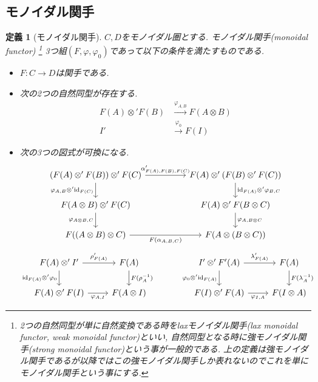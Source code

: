 \documentclass[a4paper,12pt]{ltjsarticle}
\theoremstyle{break}
\newtheorem{defn}[thm]{定義}
\newcommand{\xr}[1]{\xrightarrow{#1}}
\newcommand{\id}{\mathrm{id}}
\newcommand{\al}{\alpha}
\newcommand{\la}{\lambda}
\newcommand{\vp}{\varphi}
\newcommand{\ot}{\otimes}
\numberwithin{equation}{section}
\begin{document}
\subsection{モノイダル関手}

\begin{defn}[モノイダル関手]
  $C,D$をモノイダル圏とする. 
  モノイダル関手(monoidal functor)
  \footnote{
  2つの自然同型が単に自然変換である時をlaxモノイダル関手(lax monoidal functor, weak monoidal functor)といい, 自然同型となる時に強モノイダル関手(strong monoidal functor)という事が一般的である.
  上の定義は強モノイダル関手であるが以降ではこの強モノイダル関手しか表れないのでこれを単にモノイダル関手という事にする. 
  }
  3つ組$(F,\vp,\vp_0)$であって以下の条件を満たすものである. 
  \begin{itemize}
    \item $F: C \to D$は関手である. 
    \item 次の2つの自然同型が存在する. 
      \begin{align*}
        F(A) \ot' F(B) &\xr{\vp_{A,B}} F(A \ot B) \\
        I' &\xr{\vp_0} F(I)
      \end{align*}  
    \item 次の3つの図式が可換になる. 
    \[\begin{tikzcd}
      {(F(A) \ot' F(B)) \ot' F(C)} && {F(A) \ot' (F(B) \ot' F(C))} \\
      {F(A \ot B) \ot' F(C)} && {F(A) \ot' F(B \ot C)} \\
      {F((A \ot B) \ot C)} && {F(A \ot (B \ot C))}
      \arrow["{\al'_{F(A),F(B),F(C)}}", from=1-1, to=1-3]
      \arrow["{\vp_{A,B} \ot' \id_{F(C)}}"', from=1-1, to=2-1]
      \arrow["{\vp_{A \ot B,C}}"', from=2-1, to=3-1]
      \arrow["{\id_{F(A)} \ot' \vp_{B,C}}", from=1-3, to=2-3]
      \arrow["{\vp_{A,B \ot C}}", from=2-3, to=3-3]
      \arrow["{F(\al_{A,B,C})}"', from=3-1, to=3-3]
    \end{tikzcd}\]
    \[\begin{tikzcd}
      {F(A) \ot' I'} & {F(A)} && {I' \ot' F'(A)} & {F(A)} \\
      {F(A) \ot' F(I)} & {F(A \ot I)} && {F(I) \ot' F(A)} & {F(I \ot A)}
      \arrow["{\rho'_{F(A)}}", from=1-1, to=1-2]
      \arrow["{\id_{F(A)} \ot' \vp_0}"', from=1-1, to=2-1]
      \arrow["{\vp_{A,I}}"', from=2-1, to=2-2]
      \arrow["{F(\rho_A^{-1})}", from=1-2, to=2-2]
      \arrow["{\la'_{F(A)}}", from=1-4, to=1-5]
      \arrow["{\vp_0 \ot' \id_{F(A)}}"', from=1-4, to=2-4]
      \arrow["{F(\la_A^{-1})}", from=1-5, to=2-5]
      \arrow["{\vp_{I,A}}"', from=2-4, to=2-5]
    \end{tikzcd}\]
  \end{itemize}  
\end{defn}
\end{document}
